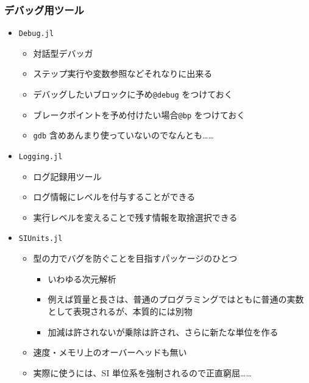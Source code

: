 \begin{frame}[containsverbatim]
\frametitle{デバッグ用ツール}
\begin{itemize}
 \item \verb|Debug.jl|
   \begin{itemize}
     \item 対話型デバッガ
     \item ステップ実行や変数参照などそれなりに出来る
     \item デバッグしたいブロックに予め\verb|@debug| をつけておく
     \item ブレークポイントを予め付けたい場合\verb|@bp| をつけておく
     \item \verb|gdb| 含めあんまり使っていないのでなんとも……
   \end{itemize}
 \item \verb|Logging.jl|
   \begin{itemize}
     \item ログ記録用ツール
     \item ログ情報にレベルを付与することができる
     \item 実行レベルを変えることで残す情報を取捨選択できる
   \end{itemize}
 \item \verb|SIUnits.jl|
   \begin{itemize}
     \item 型の力でバグを防ぐことを目指すパッケージのひとつ
       \begin{itemize}
         \item いわゆる次元解析
         \item 例えば質量と長さは、普通のプログラミングではともに普通の実数として表現されるが、本質的には別物
         \item 加減は許されないが乗除は許され、さらに新たな単位を作る
       \end{itemize}
     \item 速度・メモリ上のオーバーヘッドも無い
     \item 実際に使うには、SI 単位系を強制されるので正直窮屈……
   \end{itemize}
\end{itemize}
\end{frame}

